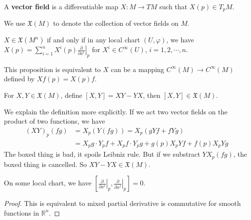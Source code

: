 \begin{defn}
    A \textbf{vector field} is a differentiable map $X:M\to TM$ such that $X(p)\in T_pM$.
\end{defn}

\begin{symb}
    We use $\mathfrak{X}(M)$ to denote the collection of vector fields on $M$.
\end{symb}

\begin{prop}
    $X\in\mathfrak{X}(M^n)$ if and only if in any local chart $(U,\varphi)$, we have $X(p)=\sum_{i=1}^nX^i(p)\left.\frac{\partial{}}{\partial{x^i}}\right|_p$ for $X^i\in C^\infty(U)$, $i=1,2,\cdots,n$.
\end{prop}

This proposition is equivalent to $X$ can be a mapping $C^\infty(M)\to C^\infty(M)$ defined by $Xf(p)=X(p)f$.

\begin{defn}
    For $X,Y\in\mathfrak{X}(M)$, define $[X,Y]=XY-YX$, then $[X,Y]\in\mathfrak{X}(M)$.
\end{defn}
\begin{rem}
    We explain the definition more explicitly.
    If we act two vector fields on the product of two functions, we have
    \begin{align*}
        (XY)_p(fg)&=X_p(Y(fg))=X_p(gYf+fYg)\\
        &=\boxed{X_pg\cdot Y_pf+X_pf\cdot Y_pg}+g(p)X_pYf+f(p)X_pYg
    \end{align*}
    The boxed thing is bad, it spoils Leibniz rule.
    But if we substract $YX_p(fg)$, the boxed thing is cancelled.
    So $XY-YX\in\mathfrak{X}(M)$.
\end{rem}

\begin{prop}
    On some local chart, we have $\left[\left.\frac{\partial{}}{\partial{x^i}}\right|_p,\left.\frac{\partial{}}{\partial{x^j}}\right|_p\right]=0$.
\end{prop}
\begin{proof}
    This is equivalent to mixed partial derivative is commutative for smooth functions in $\mathbb{R}^n$.
\end{proof}